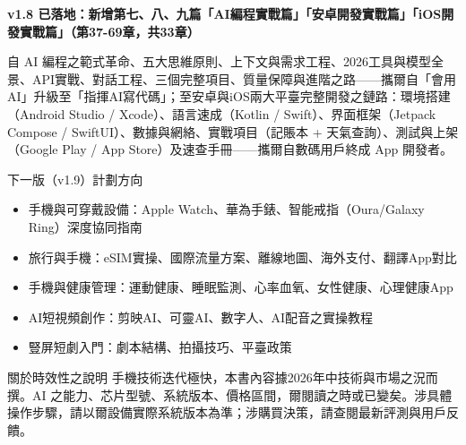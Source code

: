 

\textbf{v1.8 已落地：新增第七、八、九篇「AI編程實戰篇」「安卓開發實戰篇」「iOS開發實戰篇」（第37-69章，共33章）}\par

自 AI 編程之範式革命、五大思維原則、上下文與需求工程、2026工具與模型全景、API實戰、對話工程、三個完整項目、質量保障與進階之路——攜爾自「會用AI」升級至「指揮AI寫代碼」；至安卓與iOS兩大平臺完整開發之鏈路：環境搭建（Android Studio / Xcode）、語言速成（Kotlin / Swift）、界面框架（Jetpack Compose / SwiftUI）、數據與網絡、實戰項目（記賬本 + 天氣查詢）、測試與上架（Google Play / App Store）及速查手冊——攜爾自數碼用戶終成 App 開發者。

\begin{tcbinfo}{下一版（v1.9）計劃方向}
\begin{itemize}
  \item 手機與可穿戴設備：Apple Watch、華為手錶、智能戒指（Oura/Galaxy Ring）深度協同指南
  \item 旅行與手機：eSIM實操、國際流量方案、離線地圖、海外支付、翻譯App對比
  \item 手機與健康管理：運動健康、睡眠監測、心率血氧、女性健康、心理健康App
  \item AI短視頻創作：剪映AI、可靈AI、數字人、AI配音之實操教程
  \item 豎屏短劇入門：劇本結構、拍攝技巧、平臺政策
\end{itemize}

\end{tcbinfo}

\begin{tcbwarn}{關於時效性之說明}
手機技術迭代極快，本書內容據2026年中技術與市場之況而撰。AI 之能力、芯片型號、系統版本、價格區間，爾閱讀之時或已變矣。涉具體操作步驟，請以爾設備實際系統版本為準；涉購買決策，請查閱最新評測與用戶反饋。

\end{tcbwarn}
